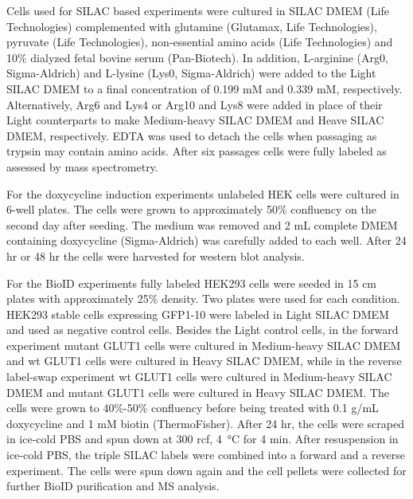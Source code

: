 Cells used for SILAC based experiments were cultured in SILAC DMEM (Life Technologies) complemented with glutamine (Glutamax, Life Technologies), pyruvate (Life Technologies), non-essential amino acids (Life Technologies) and 10\% dialyzed fetal bovine serum (Pan-Biotech). In addition, L-arginine (Arg0, Sigma-Aldrich) and L-lysine (Lys0, Sigma-Aldrich) were added to the Light SILAC DMEM to a final concentration of 0.199 mM and 0.339 mM, respectively. Alternatively, Arg6 and Lys4 or Arg10 and Lys8 were added in place of their Light counterparts to make Medium-heavy SILAC DMEM and Heave SILAC DMEM, respectively. EDTA 
was used to detach the cells when passaging as trypsin may contain amino acids. After six passages cells were fully labeled as assessed by mass spectrometry.

For the doxycycline induction experiments unlabeled HEK cells were cultured in 6-well plates. The cells were grown to approximately 50\% confluency on the second day after seeding. The medium was removed and 2 mL complete DMEM containing doxycycline (Sigma-Aldrich) was carefully added to each well. After 24 hr or 48 hr the cells were harvested for western blot analysis.

For the BioID experiments fully labeled HEK293 cells were seeded in 15 cm plates with approximately 25\% density. Two plates were used for each condition. HEK293 stable cells expressing GFP1-10 were labeled in Light SILAC DMEM and used as negative control cells. Besides the Light control cells, in the forward experiment mutant GLUT1 cells were cultured in Medium-heavy SILAC DMEM and wt GLUT1 cells were cultured in Heavy SILAC DMEM, while in the reverse label-swap experiment wt GLUT1 cells were cultured in Medium-heavy SILAC DMEM and mutant GLUT1 cells were cultured in Heavy SILAC DMEM. The cells were grown to 40\%-50\% confluency before being treated with 0.1 {}\textmu g/mL doxycycline and 1 mM biotin (ThermoFisher). After 24 hr, the cells were scraped in ice-cold PBS and spun down at 300 rcf, \SI{4}{\celsius} for 4 min. After resuspension in ice-cold PBS, the triple SILAC labels were combined into a forward and a reverse experiment. The cells were spun down again and the cell pellets were collected for further BioID purification and MS analysis.

